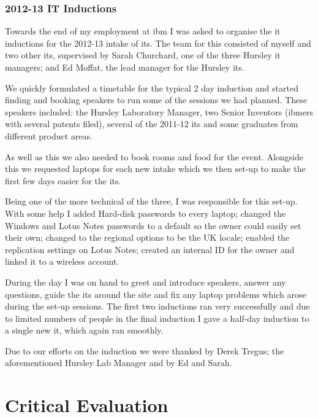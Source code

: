 \documentclass[a4paper,11pt]{report}
\begin{document}
\subsection{2012-13 IT Inductions}

Towards the end of my employment at \gls{ibm} I was asked to organise the \gls{it} inductions for
the 2012-13 intake of \gls{it}s. The team for this consisted of myself and two other \gls{it}s, 
supervised by Sarah Churchard, one of the three Hursley \gls{it} managers; and Ed Moffat, the lead
manager for the Hursley \gls{it}s.

We quickly formulated a timetable for the typical 2 day induction and started finding and booking
speakers to run some of the sessions we had planned. These speakers included: the Hursley 
Laboratory Manager, two Senior Inventors (\gls{ibm}ers with several patents filed), several of the 
2011-12 \gls{it}s and some graduates from different product areas.

As well as this we also needed to book rooms and food for the event. Alongside this we requested
laptops for each new intake which we then set-up to make the first few days easier for the 
\gls{it}s. 

Being one of the more technical of the three, I was responsible for this set-up. With some help I
added Hard-disk passwords to every laptop; changed the Windows and Lotus Notes passwords to a 
default so the owner could easily set their own; changed to the regional options to be the UK
locale; enabled the replication settings on Lotus Notes; created an internal ID for the owner and
linked it to a wireless account.

During the day I was on hand to greet and introduce speakers, answer any questions, guide the 
\gls{it}s around the site and fix any laptop problems which arose during the set-up sessions.
The first two inductions ran very successfully and due to limited numbers of people in the final
induction I gave a half-day induction to a single new \gls{it}, which again ran smoothly.

Due to our efforts on the induction we were thanked by Derek Tregus; the aforementioned Hursley 
Lab Manager and by Ed and Sarah. \\



\chapter{Critical Evaluation}
\end{document}

